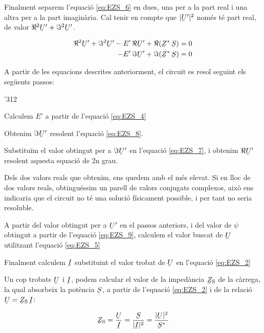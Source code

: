 Finalment separem l'equació \eqref{eq:EZS_6} en dues, una per a la part real i una altra per a la part imaginària. Cal tenir en compte que $|\cmplx{U}'|^2$ només té part real, de valor $\Re^2\cmplx{U}' + \Im^2\cmplx{U}'$.

\begin{align}
   \Re^2\cmplx{U}' + \Im^2\cmplx{U}' - E' \, \Re\cmplx{U}' + \Re(\cmplx{Z}^* \, \cmplx{S}) &= 0 \label{eq:EZS_7} \\
   - E' \, \Im\cmplx{U}' + \Im(\cmplx{Z}^* \, \cmplx{S}) &= 0 \label{eq:EZS_8}
\end{align}

A partir de les equacions descrites anteriorment, el circuit es resol seguint els següents passos:
\begin{dingautolist}{'312}
   \item Calculem $E'$ a partir de l'equació \eqref{eq:EZS_4}
   \item Obtenim $\Im\cmplx{U}'$ resolent l'equació \eqref{eq:EZS_8}.
   \item Substituïm el valor obtingut per a $\Im\cmplx{U}'$ en l'equació \eqref{eq:EZS_7}, i obtenim $\Re\cmplx{U}'$ resolent aquesta equació de 2n grau.
   \item Dels dos valors reals que obtenim, ens quedem amb el més elevat. Si en lloc de dos valors reals, obtinguéssim un parell de valors conjugats complexos, això ens indicaria que el circuit no té una solució físicament possible, i per tant no seria resoluble.
   \item A partir del valor  obtingut per a $\cmplx{U}'$ en el passos anteriors, i del valor de $\psi$ obtingut a partir de l'equació \eqref{eq:EZS_9}, calculem el valor buscat de $\cmplx{U}$ utilitzant l'equació \eqref{eq:EZS_5}
   \item Finalment calculem $\cmplx{I}$ substituint el valor trobat de $\cmplx{U}$ en l'equació \eqref{eq:EZS_2}
\end{dingautolist}

Un cop trobats $\cmplx{U}$ i $\cmplx{I}$, podem calcular el valor de
la impedància  $\cmplx{Z}\ped{S}$ de la càrrega, la qual absorbeix
la potència $\cmplx{S}$, a partir de l'equació \eqref{eq:EZS_2} i de
la relació $\cmplx{U} = \cmplx{Z}\ped{S} \,\cmplx{I}$:

\begin{equation}
   \cmplx{Z}\ped{S} = \frac{\cmplx{U}}{\cmplx{I}} =
   \frac{\cmplx{S}}{|\cmplx{I}|^2} =
   \frac{|\cmplx{U}|^2}{\cmplx{S}^*} \label{eq:EZS 10}
\end{equation}

